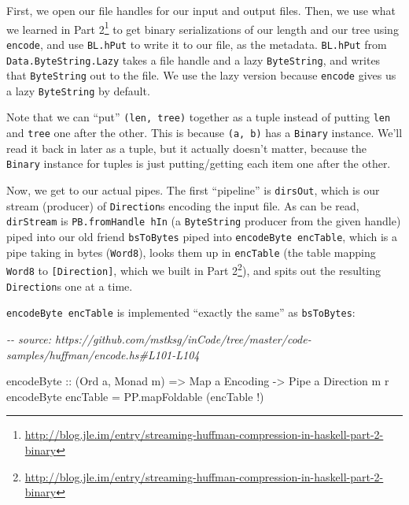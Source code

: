 \documentclass[]{article}
\newenvironment{Shaded}{}{}
\newcommand{\CommentTok}[1]{\textcolor[rgb]{0.38,0.63,0.69}{\textit{#1}}}
\newcommand{\DataTypeTok}[1]{\textcolor[rgb]{0.56,0.13,0.00}{#1}}
\newcommand{\NormalTok}[1]{#1}
\newcommand{\OperatorTok}[1]{\textcolor[rgb]{0.40,0.40,0.40}{#1}}
\newcommand{\OtherTok}[1]{\textcolor[rgb]{0.00,0.44,0.13}{#1}}
\renewcommand{\href}[2]{#2\footnote{\url{#1}}}
\begin{document}
First, we open our file handles for our input and output files. Then, we use
what we learned in
\href{http://blog.jle.im/entry/streaming-huffman-compression-in-haskell-part-2-binary}{Part
2} to get binary serializations of our length and our tree using
\texttt{encode}, and use \texttt{BL.hPut} to write it to our file, as the
metadata. \texttt{BL.hPut} from \texttt{Data.ByteString.Lazy} takes a file
handle and a lazy \texttt{ByteString}, and writes that \texttt{ByteString} out
to the file. We use the lazy version because \texttt{encode} gives us a lazy
\texttt{ByteString} by default.

Note that we can ``put'' \texttt{(len,\ tree)} together as a tuple instead of
putting \texttt{len} and \texttt{tree} one after the other. This is because
\texttt{(a,\ b)} has a \texttt{Binary} instance. We'll read it back in later as
a tuple, but it actually doesn't matter, because the \texttt{Binary} instance
for tuples is just putting/getting each item one after the other.

Now, we get to our actual pipes. The first ``pipeline'' is \texttt{dirsOut},
which is our stream (producer) of \texttt{Direction}s encoding the input file.
As can be read, \texttt{dirStream} is \texttt{PB.fromHandle\ hIn} (a
\texttt{ByteString} producer from the given handle) piped into our old friend
\texttt{bsToBytes} piped into \texttt{encodeByte\ encTable}, which is a pipe
taking in bytes (\texttt{Word8}), looks them up in \texttt{encTable} (the table
mapping \texttt{Word8} to \texttt{{[}Direction{]}}, which we built in
\href{http://blog.jle.im/entry/streaming-huffman-compression-in-haskell-part-2-binary}{Part
2}), and spits out the resulting \texttt{Direction}s one at a time.

\texttt{encodeByte\ encTable} is implemented ``exactly the same'' as
\texttt{bsToBytes}:

\begin{Shaded}
\begin{Highlighting}[]
\CommentTok{{-}{-} source: https://github.com/mstksg/inCode/tree/master/code{-}samples/huffman/encode.hs\#L101{-}L104}

\OtherTok{encodeByte ::}\NormalTok{ (}\DataTypeTok{Ord}\NormalTok{ a, }\DataTypeTok{Monad}\NormalTok{ m)}
           \OtherTok{=\textgreater{}} \DataTypeTok{Map}\NormalTok{ a }\DataTypeTok{Encoding}
           \OtherTok{{-}\textgreater{}} \DataTypeTok{Pipe}\NormalTok{ a }\DataTypeTok{Direction}\NormalTok{ m r}
\NormalTok{encodeByte encTable }\OtherTok{=}\NormalTok{ PP.mapFoldable (encTable }\OperatorTok{!}\NormalTok{)}
\end{Highlighting}
\end{Shaded}
\end{document}
